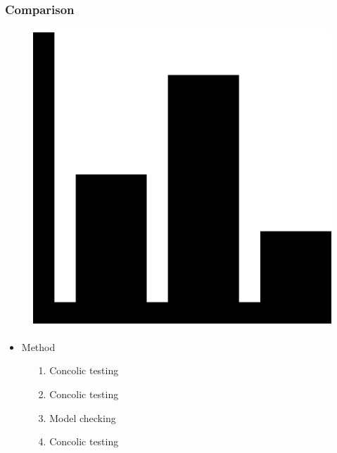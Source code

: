 \documentclass{beamer}
\begin{document}
	\begin{frame}
		\frametitle{Comparison}
		
		\begin{figure}[htbp]
			\centering
			\includegraphics[scale=0.1]{comparison}
		\end{figure}
		
		\begin{itemize}
			\item Method
			\begin{itemize}
				\color{Paper1Full}  \item[1.] Concolic testing
				\color{Paper2Full}  \item[2.] Concolic testing
				\color{Paper3Full}  \item[3.] Model checking
				\color{Paper4Full}  \item[4.] Concolic testing
			\end{itemize}
		\end{itemize}
	\end{frame}
	
\end{document}
